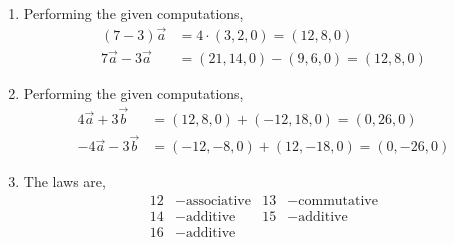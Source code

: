 \begin{enumerate}
    \item Performing the given computations,
          \begin{align}
              (7 - 3)\vec{a}      & = 4 \cdot (3, 2, 0) = (12, 8, 0)       \\
              7\vec{a} - 3\vec{a} & = (21, 14, 0) - (9, 6, 0) = (12, 8, 0)
          \end{align}

    \item Performing the given computations,
          \begin{align}
              4\vec{a} + 3\vec{b}  & = (12, 8, 0) +  (-12, 18, 0) = (0, 26, 0)   \\
              -4\vec{a} - 3\vec{b} & = (-12, -8, 0) + (12, -18, 0) = (0, -26, 0)
          \end{align}

    \item The laws are,
          \begin{align}
              12 & - \text{associative} & 13 & - \text{commutative} \\
              14 & - \text{additive}    & 15 & - \text{additive}    \\
              16 & - \text{additive}
          \end{align}


\end{enumerate}
